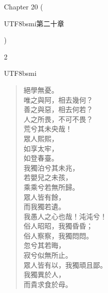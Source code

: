 Chapter 20 (\begin{CJK*}{UTF8}{bsmi}第二十章\end{CJK*})
\begin{paracol}{2}
\begin{CJK*}{UTF8}{bsmi}
\begin{verse}
絕學無憂。\\ 唯之與阿，相去幾何？\\ 善之與惡，相去何若？\\ 人之所畏，不可不畏？\\ 荒兮其未央哉！\\ 眾人熙熙，\\ 如享太牢，\\ 如登春臺。\\ 我獨泊兮其未兆，\\ 若嬰兒之未孩，\\ 乘乘兮若無所歸。\\ 眾人皆有餘，\\ 而我獨若遺。\\ 我愚人之心也哉！沌沌兮！\\ 俗人昭昭，我獨昏昏；\\ 俗人察察，我獨悶悶。\\ 忽兮其若晦，\\ 寂兮似無所止。\\ 眾人皆有以，我獨頑且鄙。\\ 我獨異於人，\\ 而貴求食於母。
\end{verse}
\end{CJK*}
\switchcolumn
\vspace*{-2ex}
\begin{verse}

\end{verse}
\end{paracol}
